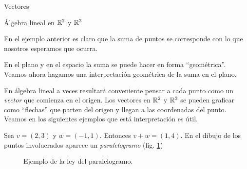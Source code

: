 \begin{chapter}{Vectores}
\begin{section}{\'Algebra lineal en $\mathbb R^2$ y $\mathbb R^3$}
    
    En  el ejemplo anterior es claro que la suma de puntos se corresponde con lo que nosotros esperamos que ocurra. 
    
    En  el plano y en el espacio la suma se puede hacer en  forma ``geométrica''. Veamos ahora hagamos una interpretación geométrica de la suma  en el plano.
    
    En  álgebra lineal a veces resultará  conveniente pensar a cada punto como un {\em vector} que comienza en el origen.  Los vectores en  $\mathbb R^2$ y $\mathbb R^3$ se pueden graficar como ``flechas'' que parten del origen y llegan a las coordenadas del punto. Veamos en los siguientes ejemplos que está interpretación es útil. 
    
    \begin{ejemplo*}
        Sea $v =(2,3)$ y $w= (-1, 1)$. Entonces $v+w= (1, 4)$. En el dibujo de los puntos involucrados aparece un \textit{paralelogramo} (fig. \ref{fig-ley-del-paralelogramo})
        \begin{figure}[h]
        	\centering
            \caption{Ejemplo de la ley del paralelogramo.}\label{fig-ley-del-paralelogramo}
        \end{figure} 
    \end{ejemplo*}
    

\end{section}
\end{chapter}
